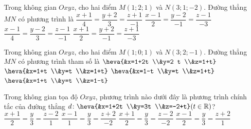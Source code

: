 \begin{ex}%
	Trong không gian $Oxyz$, cho hai điểm $M(1; 2; 1)$ và $N(3; 1;-2)$. Đường thẳng $MN$ có phương trình là
	\choice
	{$\dfrac{x+1}{4}=\dfrac{y+2}{3}=\dfrac{z+1}{-1}$}
	{\True $\dfrac{x-1}{2}=\dfrac{y-2}{-1}=\dfrac{z-1}{-3}$}
	{$\dfrac{x-1}{4}=\dfrac{y-2}{3}=\dfrac{z-1}{-1}$}
	{$\dfrac{x+1}{2}=\dfrac{y+2}{-1}=\dfrac{z+1}{-3}$}
\end{ex}
\begin{ex}%
	Trong không gian $Oxyz$, cho hai điểm $M(1; 0; 1)$ và $N(3; 2;-1)$. Đường thẳng $MN$ có phương trình tham số là
	\choice
	{$\heva{&x=1+2t \\&y=2 t \\&z=1+t}$}
	{$\heva{&x=1+t \\&y=t \\&z=1+t}$}
	{$\heva{&x=1-t \\&y=t \\&z=1+t}$}
	{\True $\heva{&x=1+t \\&y=t \\&z=1-t}$}
\end{ex}
\begin{ex}%
	Trong không gian tọa độ $Oxyz$, phương trình nào dưới đây là phương trình chính tắc của đường thẳng $d\colon\heva{&x=1+2t \\&y=3t \\&z=-2+t}(t\in \mathbb{R})$?
	\choice
	{$\dfrac{x+1}{2}=\dfrac{y}{3}=\dfrac{z-2}{1}$}
	{$\dfrac{x-1}{1}=\dfrac{y}{3}=\dfrac{z+2}{-2}$}
	{$\dfrac{x+1}{2}=\dfrac{y}{3}=\dfrac{z-2}{-2}$}
	{\True $\dfrac{x-1}{2}=\dfrac{y}{3}=\dfrac{z+2}{1}$}
\end{ex}
